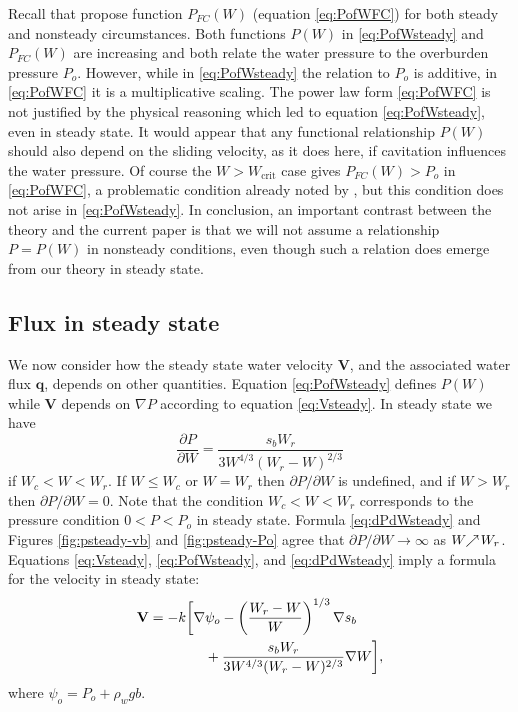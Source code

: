\documentclass[gmd]{copernicus}   %
\newcommand{\text}{\textrm}
\newcommand\bV{\mathbf{V}}
\newcommand\bq{\mathbf{q}}
\newcommand{\grad}{\nabla}
\begin{document}
Recall that \cite{FlowersClarke2002_theory} propose function $P_{FC}(W)$ (equation \eqref{eq:PofWFC}) for both steady and nonsteady circumstances.  Both functions $P(W)$ in \eqref{eq:PofWsteady} and $P_{FC}(W)$ are increasing and both relate the water pressure to the overburden pressure $P_o$.  However, while in \eqref{eq:PofWsteady} the relation to $P_o$ is additive, in \eqref{eq:PofWFC} it is a multiplicative scaling.  The power law form \eqref{eq:PofWFC} is not justified by the physical reasoning which led to equation \eqref{eq:PofWsteady}, even in steady state.   It would appear that any functional relationship $P(W)$ should also depend on the sliding velocity, as it does here, if cavitation influences the water pressure.  Of course the $W>W_{\text{crit}}$ case gives $P_{FC}(W) > P_o$ in \eqref{eq:PofWFC}, a problematic condition already noted by \cite{Schoofetal2012}, but this condition does not arise in \eqref{eq:PofWsteady}.  In conclusion, an important contrast between the \cite{FlowersClarke2002_theory} theory and the current paper is that we will not assume a relationship $P=P(W)$ in nonsteady conditions, even though such a relation does emerge from our theory in steady state.

\subsection{Flux in steady state}  We now consider how the steady state water velocity $\bV$, and the associated water flux $\bq$, depends on other quantities.  Equation \eqref{eq:PofWsteady} defines $P(W)$ while $\bV$ depends on $\grad P$ according to equation \eqref{eq:Vsteady}.  In steady state we have
\begin{equation}
\frac{\partial P}{\partial W} = \frac{s_b W_r}{3 W^{4/3} (W_r - W)^{2/3}} \label{eq:dPdWsteady}
\end{equation}
if $W_c < W < W_r$.  If $W\le W_c$ or $W=W_r$ then $\partial P/\partial W$ is undefined, and if $W>W_r$ then $\partial P/\partial W=0$.  Note that the condition $W_c < W < W_r$ corresponds to the pressure condition $0 < P < P_o$ in steady state.  Formula \eqref{eq:dPdWsteady} and Figures \ref{fig:psteady-vb} and \ref{fig:psteady-Po} agree that $\partial P / \partial W \to \infty$ as $W \!\!\nearrow\! W_r$.  Equations \eqref{eq:Vsteady}, \eqref{eq:PofWsteady}, and \eqref{eq:dPdWsteady} imply a formula for the velocity in steady state:
\begin{align}
\bV &= - k \bigg[\grad \psi_o - \left(\frac{W_r - W}{W}\right)^{1/3} \grad s_b \label{eq:Vsteadyexpand} \\
    & \qquad \qquad + \frac{s_b W_r}{3 W^{4/3} (W_r - W)^{2/3}} \grad W\bigg], \notag
\end{align}
where $\psi_o = P_o + \rho_w g b$.
\end{document}

